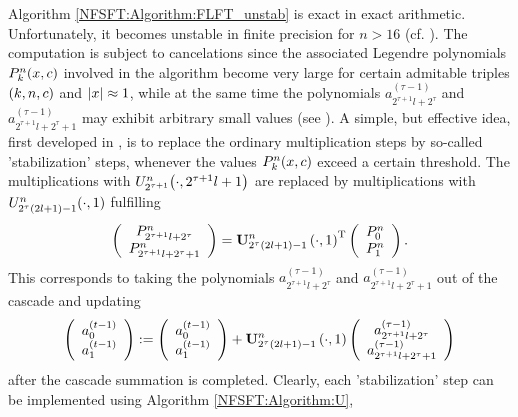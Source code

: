 Algorithm \ref{NFSFT:Algorithm:FLFT_unstab} is exact in exact arithmetic. Unfortunately, it becomes unstable in finite precision for $n > 16$ (cf. \cite{postta97}). The computation is subject to cancelations since the associated Legendre polynomials $P_{k}^n{\hspace{-0.4ex}}\left(x,c\right)$ involved in the algorithm become very large for certain admitable triples $\left(k,n,c\right)$ and $\left\vert x\right\vert \approx 1$, while at the same time the polynomials $a_{2^{\tau+1}l+2^{\tau}}^{(\tau-1)}$ and $a_{2^{\tau+1}l+2^{\tau}+1}^{(\tau-1)}$ may exhibit arbitrary small values (see \cite{kupo02}). A simple, but effective idea, first developed in \cite{postta97}, is to replace the ordinary multiplication steps by so-called 'stabilization' steps, whenever the values $P_{k}^n{\hspace{-0.4ex}}\left(x,c\right)$ exceed a certain threshold. The multiplications with $U_{2^{\tau+1}}^n{\hspace{-0.4ex}}\left(\cdot,2^{\tau+1}l+1\right)$ are replaced by multiplications with $U_{2^{\tau}(2l+1)-1}^n{\hspace{-0.4ex}}\left(\cdot,1\right)$ fulfilling
\[
	\left(\begin{array}{c}
	  P_{2^{\tau+1}l+2^{\tau}}^{n}\\ 
	  P_{2^{\tau+1}l+2^{\tau}+1}^{n}
	\end{array}\right)
	=
	\mathbf{U}_{2^{\tau}(2l+1)-1}^{n}\left(\cdot,1\right)^{\text{\rm{T}}}
		\left(\begin{array}{c}
	  P_{0}^{n}\\
	  P_{1}^{n}
	\end{array}\right).
\]
This corresponds to taking the polynomials $a_{2^{\tau+1}l+2^{\tau}}^{(\tau-1)}$ and $a_{2^{\tau+1}l+2^{\tau}+1}^{(\tau-1)}$ out of the cascade and updating
\begin{equation}
  \label{NFSFT:StabilizationStep}
	\left(\begin{array}{c}
	  a_{0}^{(t-1)}\\
	  a_{1}^{(t-1)}
	\end{array}\right)
	:=
	\left(\begin{array}{c}
	  a_{0}^{(t-1)}\\
	  a_{1}^{(t-1)}
	\end{array}\right)
  +
	\mathbf{U}_{2^{\tau}(2l+1)-1}^{n}\left(\cdot,1\right)
	\left(\begin{array}{c}
	  a_{2^{\tau+1}l+2^{\tau}}^{(\tau-1)}\\
	  a_{2^{\tau+1}l+2^{\tau}+1}^{(\tau-1)}
	\end{array}\right)  
\end{equation}
\label{DSFT:Stabilization}
after the cascade summation is completed. Clearly, each 'stabilization' step can be implemented using Algorithm \ref{NFSFT:Algorithm:U}, 

